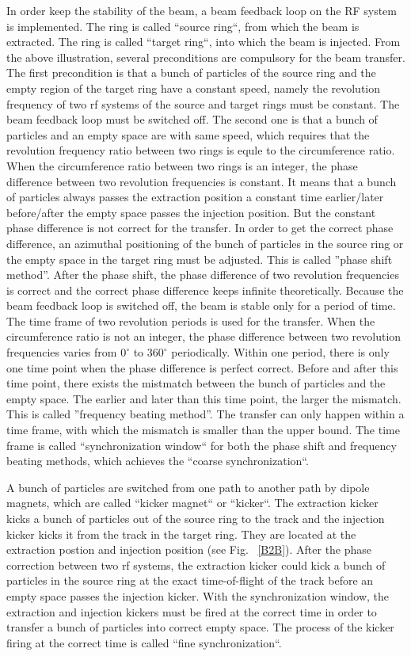 In order keep the stability of the beam, a beam feedback loop on the RF system is implemented. The ring is called ``source ring``, from which the beam is extracted. The ring is called ``target ring``, into which the beam is injected. From the above illustration, several preconditions are compulsory for the beam transfer. The first precondition is that a bunch of particles of the source ring and the empty region of the target ring have a constant speed, namely the revolution frequency of two rf systems of the source and target rings must be constant. The beam feedback loop must be switched off. The second one is that a bunch of particles and an empty space are with same speed, which requires that the revolution frequency ratio between two rings is equle to the circumference ratio. When the circumference ratio between two rings is an integer, the phase difference between two revolution frequencies is constant. It means that a bunch of particles always passes the extraction position a constant time earlier/later before/after the empty space passes the injection position. But the constant phase difference is not correct for the transfer. In order to get the correct phase difference, an azimuthal positioning of the bunch of particles in the source ring or the empty space in the target ring must be adjusted. This is called  ''phase shift method''. After the phase shift, the phase difference of two revolution frequencies is correct and the correct phase difference keeps infinite theoretically. Because the beam feedback loop is switched off, the beam is stable only for a period of time. The time frame of two revolution periods is used for the transfer. When the circumference ratio is not an integer, the phase difference between two revolution frequencies varies from $0^\circ$ to $360^\circ$ periodically. Within one period, there is only one time point when the phase difference is perfect correct. Before and after this time point, there exists the mistmatch between the bunch of particles and the empty space. The earlier and later than this time point, the larger the mismatch. This is called ''frequency beating method''. The transfer can only happen within a time frame, with which the mismatch is smaller than the upper bound. The time frame is called ``synchronization window`` for both the phase shift and frequency beating methods, which achieves the ``coarse synchronization``.

A bunch of particles are switched from one path to another path by dipole magnets, which are called ``kicker magnet`` or ``kicker``. The extraction kicker kicks a bunch of particles out of the source ring to the track and the injection kicker kicks it from the track in the target ring. They are located at the extraction postion and injection position (see Fig. ~\ref{B2B}). After the phase correction between two rf systems, the extraction kicker could kick a bunch of particles in the source ring at the exact time-of-flight of the track before an empty space passes the injection kicker. With the synchronization window, the extraction and injection kickers must be fired at the correct time in order to transfer a bunch of particles into correct empty space. The process of the kicker firing at the correct time is called ``fine synchronization``.

